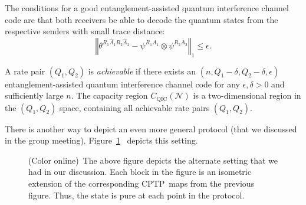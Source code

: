 \documentclass[aps,11pt,twoside,letterpaper]{article}
\begin{document}
		
		The conditions for a good entanglement-assisted quantum interference channel
		code are that both receivers be able to decode the quantum states from the
		respective senders with small trace distance:%
		\[
		\left\Vert \theta^{R_{1}\hat{A}_{1}R_{2}\hat{A}_{2}}-\psi^{R_{1}A_{1}}%
		\otimes\psi^{R_{2}A_{2}}\right\Vert _{1}\leq\epsilon.
		\]

		
		A rate pair $(Q_{1},Q_{2})$ is \textit{achievable} if there exists an
		$(n,Q_{1}-\delta,Q_{2}-\delta,\epsilon)$ entanglement-assisted quantum
		interference channel code for any $\epsilon,\delta>0$ and sufficiently large
		$n$. The capacity region $C_{\text{QIC}}(\mathcal{N})$ is a two-dimensional
		region in the $(Q_{1},Q_{2})$ space, containing all achievable rate pairs
		$(Q_{1},Q_{2})$.

		There is another way to depict an even more general protocol (that we
		discussed in the group meeting). Figure~\ref{fig:interference-discussion}%
		\ depicts this setting.%
		\begin{figure}
		[ptb]
		\begin{center}
		\caption{(Color online)\ The above figure depicts the alternate setting that
		we had in our discussion. Each block in the figure is an isometric extension
		of the corresponding CPTP\ maps from the previous figure. Thus, the state is
		pure at each point in the protocol.}%
		\label{fig:interference-discussion}%
		\end{center}
		\end{figure}

		
\end{document}

